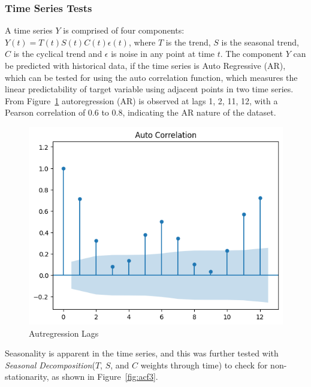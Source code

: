 \documentclass{ieeeaccess}
\begin{document}
\subsubsection{Time Series Tests}
A time series $Y$ is comprised of four components: $Y(t)=T(t)S(t)C(t)\epsilon(t)$, where $T$ is the trend, $S$ is the seasonal trend, $C$ is the cyclical trend and $\epsilon$ is noise in any point at time $t$.
The component $Y$ can be predicted with historical data, if the time series is Auto Regressive (AR), which can be tested for using the auto correlation function, which measures the linear predictability of target variable using adjacent points in two time series. From Figure~\ref{fig:acf1} autoregression (AR) is observed at lags 1, 2, 11, 12, with a Pearson correlation of 0.6 to 0.8, indicating the AR nature of the dataset.
\begin{figure}[htb]
    \centering
    \includegraphics[width=\columnwidth]{data_analysis/acf1.png}
    \caption{Autregression Lags}
    \label{fig:acf1}
\end{figure}
Seasonality is apparent in the time series, and this was further tested with \textit{Seasonal Decomposition}($T$, $S$, and $C$ weights through time) to check for non-stationarity, as shown in Figure~\ref{fig:acf3}.
\end{document}
